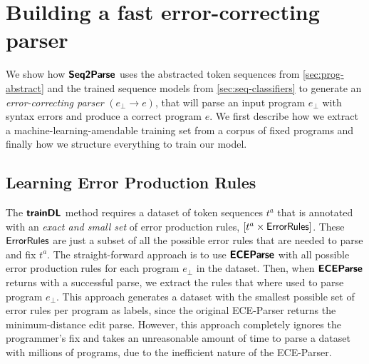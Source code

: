 \section{Building a fast error-correcting parser}
\label{sec:whole-system}

We show how $\bm{\mathsf{Seq2Parse}}$ uses the abstracted token sequences from
\autoref{sec:prog-abstract} and the trained sequence models from
\autoref{sec:seq-classifiers} to generate an \emph{error-correcting parser}
$(e_{\bot} \to e)$, that will parse an input program $e_{\bot}$ with syntax
errors and produce a correct program $e$. We first describe how we extract a
machine-learning-amendable training set from a corpus of fixed programs and
finally how we structure everything to train our model.


\subsection{Learning Error Production Rules}
\label{sec:whole-system:error-rules}

The $\bm{\mathsf{trainDL}}$ method requires a dataset of token sequences $t^a$ that is
annotated with an \emph{exact and small set} of error production rules, \ie
$[t^a \times \mathsf{ErrorRules}]$. These $\mathsf{ErrorRules}$ are just a subset of
all the possible error rules that are needed to parse and fix $t^a$. The
straight-forward approach is to use $\bm{\mathsf{ECEParse}}$ with all possible error
production rules for each program $e_{\bot}$ in the dataset. Then, when
$\bm{\mathsf{ECEParse}}$ returns with a successful parse, we extract the rules that where used
to parse program $e_{\bot}$. This approach generates a dataset with the smallest
possible set of error rules per program as labels, since the original ECE-Parser
returns the minimum-distance edit parse. However, this approach completely
ignores the programmer's fix and takes an unreasonable amount of time to parse a
dataset with millions of programs, due to the inefficient nature of the
ECE-Parser.

